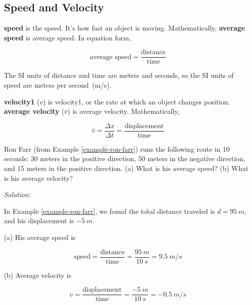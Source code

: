 \documentclass[dvipsnames]{article}
\begin{document}
\subsection{Speed and Velocity}

\textbf{\Gls{speed}} is the \glsdesc{speed}. It's how fast an object is moving. Mathematically, \textbf{\gls{average speed}} is \glsdesc{average speed}. In equation form,

\begin{equation}
    \text{average speed} = \frac{\mathrm{distance}}{\mathrm{time}}
\end{equation}

The SI units of distance and time are meters and seconds, so the SI units of speed are meters per second~(m/s).

\textbf{\Gls{velocity1}} ($v$) is \glsdesc{velocity1}, or the rate at which an object changes position. \textbf{\Gls{average velocity}} ($\bar{v}$) is \glsdesc{average velocity}. Mathematically, 

\begin{equation} \label{average-velocity}
    \bar{v} = \frac{\Delta x}{\Delta t} = \frac{\mathrm{displacement}}{\mathrm{time}}
\end{equation}

\begin{example}
    Ron Farr (from Example \ref{example-ron-farr}) runs the following route in 10 seconds: 30 meters in the positive direction, 50 meters in the negative direction, and 15 meters in the positive direction. (a) What is his average speed? (b) What is his average velocity?
\end{example}

\textit{Solution:}

In Example \ref{example-ron-farr}, we found the total distance traveled is $d = \SI{95}{m}$, and his displacement is $\SI{-5}{m}$.

(a) His average speed is

\begin{equation*}
    \text{speed} = \frac{\text{distance}}{\text{time}} = \frac{\SI{95}{m}}{\SI{10}{s}} = \boxed{\SI{9.5}{m/s}}
\end{equation*}

(b) Average velocity is

\begin{equation*}
    v = \frac{\text{displacement}}{\text{time}} = \frac{\SI{-5}{m}}{\SI{10}{s}} = \boxed{\SI{-0.5}{m/s}}
\end{equation*}
\end{document}
